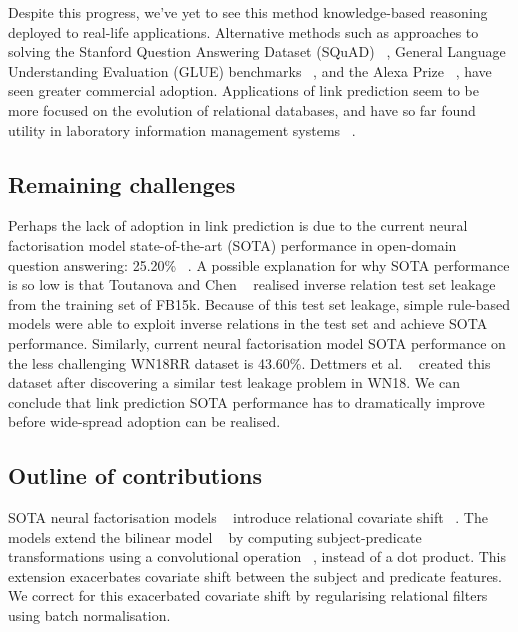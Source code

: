 \noindent Despite this progress, we've yet to see this method knowledge-based reasoning deployed to real-life applications. Alternative methods such as approaches to solving the Stanford Question Answering Dataset (SQuAD) \unskip~\citep{rajpurkar2016squad}, General Language Understanding Evaluation (GLUE) benchmarks \unskip~\citep{liu2019roberta}, and the Alexa Prize \unskip~\citep{ram2018conversational}, have seen greater commercial adoption. Applications of link prediction seem to be more focused on the evolution of relational databases, and have so far found utility in laboratory information management systems \unskip~\citep{HARROW20192068}. 

\subsection{Remaining challenges}

Perhaps the lack of adoption in link prediction is due to the current neural factorisation model state-of-the-art (SOTA) performance in open-domain question answering: 25.20\% \unskip~\citep{balazevic2019hypernetwork}. A possible explanation for why SOTA performance is so low is that Toutanova and Chen \unskip~\citep{toutanova2015observed} realised inverse relation test set leakage from the training set of FB15k. Because of this test set leakage, simple rule-based models were able to exploit inverse relations in the test set and achieve SOTA performance. Similarly, current neural factorisation model SOTA performance on the less challenging WN18RR dataset is 43.60\%. Dettmers et al. \unskip~\citep{dettmers2018convolutional} created this dataset after discovering a similar test leakage problem in WN18. We can conclude that link prediction SOTA performance has to dramatically improve before wide-spread adoption can be realised. 

\subsection{Outline of contributions}

SOTA neural factorisation models \unskip~\citep{balazevic2019hypernetwork, dettmers2018convolutional} introduce relational covariate shift \unskip~\citep{ioffe2015batch}. The models extend the bilinear model \unskip~\citep{jenatton2012latent} by computing subject-predicate transformations using a convolutional operation \unskip~\citep{zeiler2014visualizing}, instead of a dot product. This extension exacerbates covariate shift between the subject and predicate features. We correct for this exacerbated covariate shift by regularising relational filters using batch normalisation. \par

